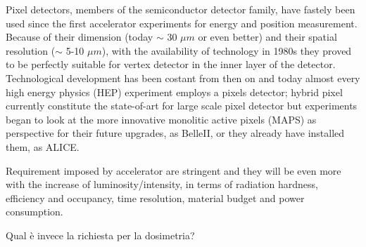 Pixel detectors, members of the semiconductor detector family, have fastely been used since the first accelerator experiments for energy and position measurement.
Because of their dimension (today $\sim$ 30 $\mu m$ or even better) and their spatial resolution ($\sim$ 5-10 $\mu m$), with the availability of technology in 1980s they proved to be perfectly suitable for vertex detector in the inner layer of the detector.\\
Technological development has been costant from then on and today almost every high energy physics (HEP) experiment employs a pixels detector; hybrid pixel currently constitute the state-of-art for large scale pixel detector but experiments began to look at the more innovative monolitic active pixels (MAPS) as perspective for their future upgrades, as BelleII, or they already have installed them, as ALICE.

Requirement imposed by accelerator are stringent and they will be even more with the increase of luminosity/intensity, in terms of radiation hardness, efficiency and occupancy, time resolution, material budget and power consumption.

Qual è invece la richiesta per la dosimetria? \\



